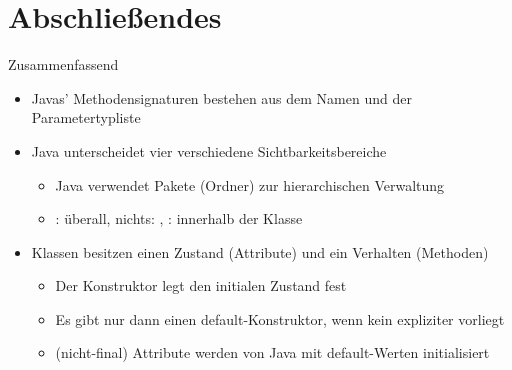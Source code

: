 \section{Abschließendes}
{\SummaryFrame
\begin{frame}[t]{Zusammenfassend}
\pause \printBibCommand
\vfill\vfill %
\begin{itemize}[<+(1)->]
    \itemsep5pt
    \item Javas' Methodensignaturen bestehen aus dem Namen und der Parametertypliste
    \item Java unterscheidet vier verschiedene Sichtbarkeitsbereiche \begin{itemize}
        \item Java verwendet Pakete (Ordner) zur hierarchischen Verwaltung
        \item {}: überall, nichts: , : innerhalb der Klasse
    \end{itemize}
    \item Klassen besitzen einen Zustand (Attribute) und ein Verhalten (Methoden) \begin{itemize}
        \item Der Konstruktor legt den initialen Zustand fest
        \item Es gibt nur dann einen default-Konstruktor, wenn kein expliziter vorliegt
        \item (nicht-final) Attribute werden von Java mit default-Werten initialisiert
    \end{itemize}
\end{itemize}
\end{frame}
}




\iffull\fi
